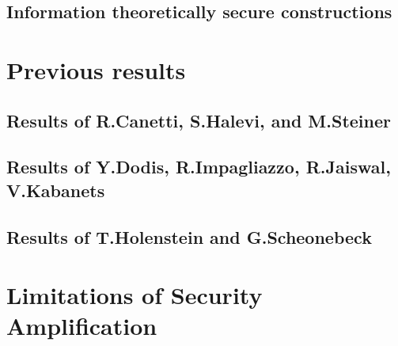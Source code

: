 \documentclass[11pt,a4paper,titlepage]{memoir}
\begin{document}
\subsection{Information theoretically secure constructions}
\section{Previous results}
\label{st:previous_results}
\subsection{Results of R.Canetti, S.Halevi, and M.Steiner}
\subsection{Results of Y.Dodis, R.Impagliazzo, R.Jaiswal, V.Kabanets}
\subsection{Results of T.Holenstein and G.Scheonebeck}
\section{Limitations of Security Amplification}



\appendix


\backmatter



\end{document}
